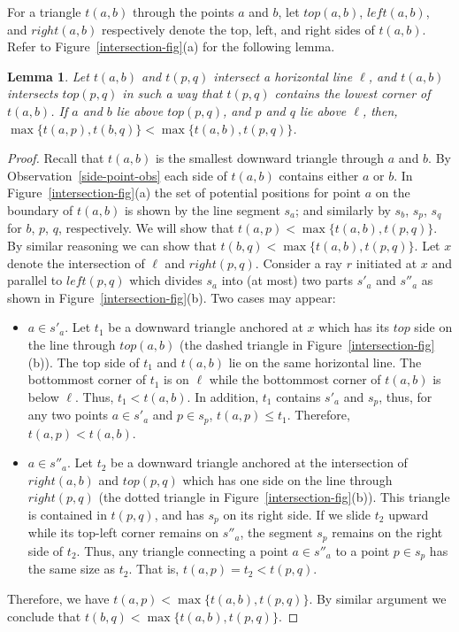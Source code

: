 \documentclass[11pt,a4paper]{article}
\newtheorem{lemma}{Lemma}
\begin{document}
For a triangle $t(a,b)$ through the points $a$ and $b$, let $top(a,b)$, $left(a,b)$, and $right(a,b)$ respectively denote the top, left, and right sides of $t(a,b)$. Refer to Figure~\ref{intersection-fig}(a) for the following lemma.
\begin{lemma}
\label{triangle3}
 Let $t(a,b)$ and $t(p,q)$ intersect a horizontal line $\ell$, and $t(a,b)$ intersects $top(p,q)$ in such a way that $t(p,q)$ contains the lowest corner of $t(a,b)$. If $a$ and $b$ lie above $top(p,q)$, and $p$ and $q$ lie above $\ell$, then, $\max\{t(a,p), t(b,q)\} < \max\{t(a,b), t(p,q)\}$.
\end{lemma}
\begin{proof}
Recall that $t(a,b)$ is the smallest downward triangle through $a$ and $b$. By Observation~\ref{side-point-obs} each side of $t(a,b)$ contains either $a$ or $b$. 
In Figure~\ref{intersection-fig}(a) the set of potential positions for point $a$ on the boundary of $t(a,b)$ is shown by the line segment $s_a$; and similarly by $s_b$, $s_p$, $s_q$ for $b$, $p$, $q$, respectively. We will show that $t(a,p)<\max\{t(a,b), t(p,q)\}$. By similar reasoning we can show that $t(b,q)<\max\{t(a,b), t(p,q)\}$. Let $x$ denote the intersection of $\ell$ and $right(p,q)$. Consider a ray $r$ initiated at $x$ and parallel to $left(p,q)$ which divides $s_a$ into (at most) two parts $s'_a$ and $s''_a$ as shown in Figure~\ref{intersection-fig}(b). Two cases may appear:

\begin{itemize}
 \item $a\in s'_a$. Let $t_1$ be a downward triangle anchored at $x$ which has its $top$ side on the line through $top(a,b)$ (the dashed triangle in Figure~\ref{intersection-fig}(b)). The top side of $t_1$ and $t(a,b)$ lie on the same horizontal line. The bottommost corner of $t_1$ is on $\ell$ while the bottommost corner of $t(a,b)$ is below $\ell$. Thus, $t_1<t(a,b)$. In addition, $t_1$ contains $s'_a$ and $s_p$, thus, for any two points $a\in s'_a$ and $p\in s_p$, $t(a,p)\le t_1$. Therefore, $t(a,p)< t(a,b)$.
 \item $a \in s''_a$. Let $t_2$ be a downward triangle anchored at the intersection of $right(a,b)$ and $top(p,q)$ which has one side on the line through $right(p,q)$ (the dotted triangle in Figure~\ref{intersection-fig}(b)). This triangle is contained in $t(p,q)$, and has $s_p$ on its right side. If we slide $t_2$ upward while its top-left corner remains on $s''_a$, the segment $s_p$ remains on the right side of $t_2$. Thus, any triangle connecting a point $a\in s''_a$ to a point $p\in s_p$ has the same size as $t_2$. That is, $t(a,p)=t_2<t(p,q)$. 
\end{itemize}

Therefore, we have $t(a,p)<\max\{t(a,b), t(p,q)\}$. By similar argument we conclude that $t(b,q)<\max\{t(a,b), t(p,q)\}$.  
\end{proof}
\end{document}
